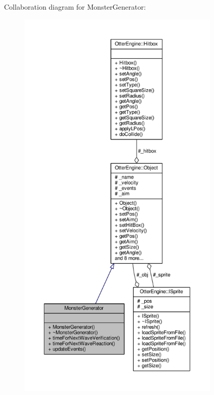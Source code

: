 Collaboration diagram for Monster\+Generator\+:\nopagebreak
\begin{figure}[H]
\begin{center}
\leavevmode
\includegraphics[height=550pt]{d8/d64/class_monster_generator__coll__graph}
\end{center}
\end{figure}
